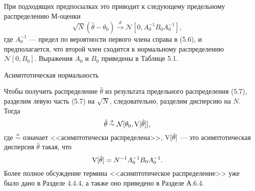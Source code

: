 При подходящих предпосылках это приводит к следующему предельному распределению М-оценки
\begin{equation}
\sqrt{N}(\hat{\theta} - \theta_0) \xrightarrow{d} \mathcal{N}[0,A_0^{-1}B_0 A_0^{-1}],
\end{equation}
где $A_0^{-1}$ --- предел по вероятности первого члена справа в (5.6), и предполагается, что второй член сходится к нормальному распределению $\mathcal{N}[0,B_0]$. Выражения $A_0$ и $B_0$ приведены в Таблице 5.1.

\begin{center}
Асимптотическая нормальность
\end{center}

Чтобы получить распределение $\hat{\theta}$ из результата предельного распределения (5.7), разделим левую часть (5.7) на $\sqrt{N}$, следовательно, разделим дисперсию на $N$. Тогда
\begin{equation}
\hat{\theta} \stackrel{a}{\sim}\mathcal{N}[\theta_0,\mathrm{V}[\hat{\theta}]],
\end{equation}
где $\stackrel{a}{\sim}$ означает <<асимптотически распределена>>, $\mathrm{V}[\hat{\theta}]$ --- это асимптотическая дисперсия $\hat{\theta}$ такая, что 
\begin{equation}
\mathrm{V}[\hat{\theta}]=N^{-1}A_0^{-1}B_0 A_0^{-1}.
\end{equation}
Более полное обсуждение термина <<асимптотическое распределение>> уже было дано в Разделе 4.4.4, а также оно приведено в Разделе А.6.4. 

